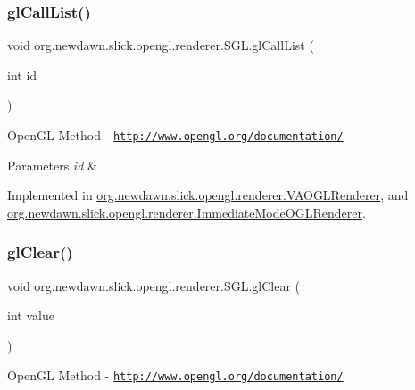 \subsubsection{\texorpdfstring{gl\+Call\+List()}{glCallList()}}
{\footnotesize\ttfamily void org.\+newdawn.\+slick.\+opengl.\+renderer.\+S\+G\+L.\+gl\+Call\+List (\begin{DoxyParamCaption}\item[{int}]{id }\end{DoxyParamCaption})}

Open\+GL Method -\/  \href{http://www.opengl.org/documentation/}{\tt http\+://www.\+opengl.\+org/documentation/}


\begin{DoxyParams}{Parameters}
{\em id} & \\
\hline
\end{DoxyParams}


Implemented in \mbox{\hyperlink{classorg_1_1newdawn_1_1slick_1_1opengl_1_1renderer_1_1_v_a_o_g_l_renderer_a555f7675fbd042770b6bf759169a48a6}{org.\+newdawn.\+slick.\+opengl.\+renderer.\+V\+A\+O\+G\+L\+Renderer}}, and \mbox{\hyperlink{classorg_1_1newdawn_1_1slick_1_1opengl_1_1renderer_1_1_immediate_mode_o_g_l_renderer_a30770752ebb5e2bbc31f322368dfa46e}{org.\+newdawn.\+slick.\+opengl.\+renderer.\+Immediate\+Mode\+O\+G\+L\+Renderer}}.

\mbox{\label{interfaceorg_1_1newdawn_1_1slick_1_1opengl_1_1renderer_1_1_s_g_l_a254bdaa78a48f3fd3fd4ada15c910d4a}} 
\subsubsection{\texorpdfstring{gl\+Clear()}{glClear()}}
{\footnotesize\ttfamily void org.\+newdawn.\+slick.\+opengl.\+renderer.\+S\+G\+L.\+gl\+Clear (\begin{DoxyParamCaption}\item[{int}]{value }\end{DoxyParamCaption})}

Open\+GL Method -\/  \href{http://www.opengl.org/documentation/}{\tt http\+://www.\+opengl.\+org/documentation/}


